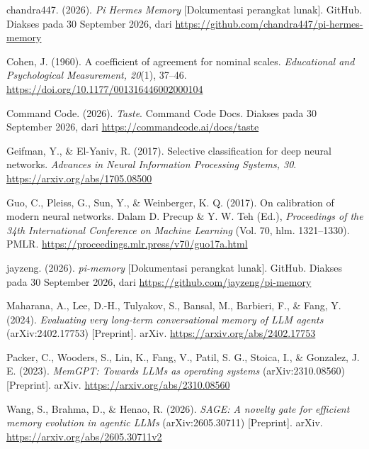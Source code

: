 \documentclass[12pt,a4paper]{article}
\begin{document}
\begin{singlespace}
\raggedright
\begin{list}{}{%
  \setlength{\leftmargin}{1.25cm}%
  \setlength{\itemindent}{-1.25cm}%
  \setlength{\itemsep}{0.8\baselineskip}%
  \setlength{\parsep}{0pt}%
}
\item chandra447. (2026). \textit{Pi Hermes Memory} [Dokumentasi perangkat lunak]. GitHub. Diakses pada 30 September 2026, dari \url{https://github.com/chandra447/pi-hermes-memory}

\item Cohen, J. (1960). A coefficient of agreement for nominal scales. \textit{Educational and Psychological Measurement, 20}(1), 37--46. \url{https://doi.org/10.1177/001316446002000104}

\item Command Code. (2026). \textit{Taste}. Command Code Docs. Diakses pada 30 September 2026, dari \url{https://commandcode.ai/docs/taste}

\item Geifman, Y., \& El-Yaniv, R. (2017). Selective classification for deep neural networks. \textit{Advances in Neural Information Processing Systems, 30}. \url{https://arxiv.org/abs/1705.08500}

\item Guo, C., Pleiss, G., Sun, Y., \& Weinberger, K. Q. (2017). On calibration of modern neural networks. Dalam D. Precup \& Y. W. Teh (Ed.), \textit{Proceedings of the 34th International Conference on Machine Learning} (Vol. 70, hlm. 1321--1330). PMLR. \url{https://proceedings.mlr.press/v70/guo17a.html}

\item jayzeng. (2026). \textit{pi-memory} [Dokumentasi perangkat lunak]. GitHub. Diakses pada 30 September 2026, dari \url{https://github.com/jayzeng/pi-memory}

\item Maharana, A., Lee, D.-H., Tulyakov, S., Bansal, M., Barbieri, F., \& Fang, Y. (2024). \textit{Evaluating very long-term conversational memory of LLM agents} (arXiv:2402.17753) [Preprint]. arXiv. \url{https://arxiv.org/abs/2402.17753}

\item Packer, C., Wooders, S., Lin, K., Fang, V., Patil, S. G., Stoica, I., \& Gonzalez, J. E. (2023). \textit{MemGPT: Towards LLMs as operating systems} (arXiv:2310.08560) [Preprint]. arXiv. \url{https://arxiv.org/abs/2310.08560}

\item Wang, S., Brahma, D., \& Henao, R. (2026). \textit{SAGE: A novelty gate for efficient memory evolution in agentic LLMs} (arXiv:2605.30711) [Preprint]. arXiv. \url{https://arxiv.org/abs/2605.30711v2}


\end{list}
\end{singlespace}
\end{document}
